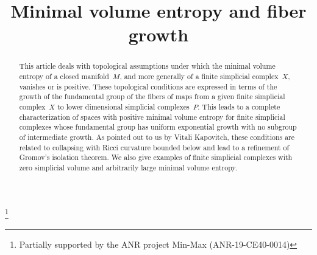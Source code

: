 \documentclass[JEP,XML,SOM,Unicode,NoFloatCountersInSection,published]{cedram}
\theoremstyle{definition}
\begin{document}
\frontmatter
\title{Minimal volume entropy and fiber growth}

\author[\initial{I.} \lastname{Babenko}]{ }
\address{Université Montpellier II, CNRS UMR 5149,
Institut Montpelliérain Alexander Grothendieck,\\
Place Eugène Bataillon, Bât. 9, CC051, 34095 Montpellier Cedex 5, France}
\urladdr{}

\author[\initial{S.} \lastname{Sabourau}]{ }
\address{Univ Paris Est Creteil, CNRS, LAMA,\\ F-94010 Creteil, France \\
\& Univ Gustave Eiffel, LAMA,\\ F-77447 Marne-la-Vallée, France}

\thanks{Partially supported by the ANR project Min-Max (ANR-19-CE40-0014)}

\begin{abstract}
This article deals with topological assumptions under which the minimal volume entropy of a closed manifold~$M$, and more generally of a finite simplicial complex~$X$, vanishes or is positive. These topological conditions are expressed in terms of the growth of the fundamental group of the fibers of maps from a given finite simplicial complex~$X$ to lower dimensional simplicial complexes~$P$. This leads to a complete characterization of spaces with positive minimal volume entropy for finite simplicial complexes whose fundamental group has uniform exponential growth with no subgroup of intermediate growth. As pointed out to us by Vitali Kapovitch, these conditions are related to collapsing with Ricci curvature bounded below and lead to a refinement of Gromov's isolation theorem. We also give examples of finite simplicial complexes with zero simplicial volume and arbitrarily large minimal volume entropy.
\end{abstract}




\end{document}
